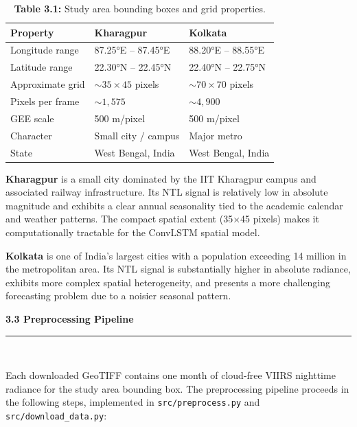 \documentclass[12pt,a4paper]{report}
\begin{document}
\begin{table}[H]
\centering
\caption*{\textbf{Table 3.1:} Study area bounding boxes and grid properties.}
\begin{tabular}{lll}
\toprule
\textbf{Property} & \textbf{Kharagpur} & \textbf{Kolkata} \\
\midrule
Longitude range   & 87.25°E -- 87.45°E & 88.20°E -- 88.55°E \\
Latitude range    & 22.30°N -- 22.45°N & 22.40°N -- 22.75°N \\
Approximate grid  & ${\sim}35 \times 45$ pixels & ${\sim}70 \times 70$ pixels \\
Pixels per frame  & ${\sim}1{,}575$ & ${\sim}4{,}900$ \\
GEE scale         & 500 m/pixel & 500 m/pixel \\
Character         & Small city / campus & Major metro \\
State             & West Bengal, India & West Bengal, India \\
\bottomrule
\end{tabular}
\end{table}

\textbf{Kharagpur} is a small city dominated by the IIT Kharagpur campus and associated railway infrastructure. Its NTL signal is relatively low in absolute magnitude and exhibits a clear annual seasonality tied to the academic calendar and weather patterns. The compact spatial extent (35$\times$45 pixels) makes it computationally tractable for the ConvLSTM spatial model.

\textbf{Kolkata} is one of India's largest cities with a population exceeding 14 million in the metropolitan area. Its NTL signal is substantially higher in absolute radiance, exhibits more complex spatial heterogeneity, and presents a more challenging forecasting problem due to a noisier seasonal pattern.

\vspace{0.5cm}
\begin{center}
    \hypertarget{sec:s33}{}%
    {\large \textbf{3.3 Preprocessing Pipeline}}\\[0.3cm]
    \noindent\rule{\linewidth}{0.4pt}\\[0.5cm]
\end{center}

Each downloaded GeoTIFF contains one month of cloud-free VIIRS nighttime radiance for the study area bounding box. The preprocessing pipeline proceeds in the following steps, implemented in \texttt{src/preprocess.py} and \texttt{src/download\_data.py}:
\end{document}
